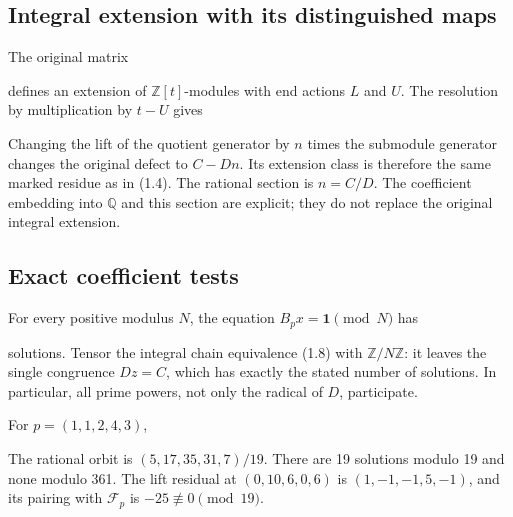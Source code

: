 \subsection{Integral extension with its distinguished maps}

The original matrix


defines an extension of \(\mathbb Z[t]\)-modules with end actions \(L\)
and \(U\). The resolution by multiplication by \(t-U\) gives


Changing the lift of the quotient generator by \(n\) times the submodule
generator changes the original defect to \(C-Dn\). Its extension class
is therefore the same marked residue as in (1.4). The rational section
is \(n=C/D\). The coefficient embedding into \(\mathbb Q\) and this
section are explicit; they do not replace the original integral
extension.

\subsection{Exact coefficient tests}

For every positive modulus \(N\), the equation \(B_px=\mathbf1\pmod N\)
has


solutions. Tensor the integral chain equivalence (1.8) with
\(\mathbb Z/N\mathbb Z\): it leaves the single congruence \(Dz=C\),
which has exactly the stated number of solutions. In particular, all
prime powers, not only the radical of \(D\), participate.

For \(p=(1,1,2,4,3)\),


The rational orbit is \((5,17,35,31,7)/19\). There are 19 solutions
modulo 19 and none modulo 361. The lift residual at \((0,10,6,0,6)\) is
\((1,-1,-1,5,-1)\), and its pairing with \(\mathcal F_p\) is
\(-25\not\equiv0\pmod{19}\).

